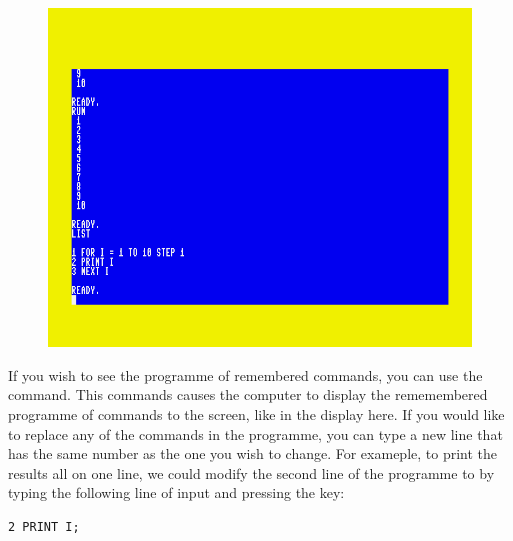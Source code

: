   \setlength{\intextsep}{0pt}%
  \begin{figure}
    \includegraphics[width=\linewidth]{images/first-steps-for-loop-programme-1-listing.png}
  \end{figure}

  If you wish to see the programme of remembered commands, you can use the 
  command.  This commands causes the computer to display the rememembered programme of commands to the screen, like in the display here.
  If you would like to replace any of the commands in the programme, you can type a new line that has the same number as the one you wish to change. For exameple, to print the results all on one line, we could modify the second line of the programme to  by
  typing the following line of input and pressing the  key:

\begin{tcolorbox}[colback=black,coltext=white]
\verbatimfont{\codefont}
\begin{verbatim}
2 PRINT I;
\end{verbatim}
\end{tcolorbox}

